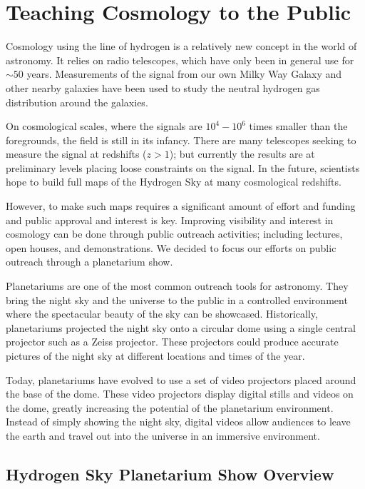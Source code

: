 \chapter{Teaching \cm Cosmology to the Public}\label{Ch:Planet}

Cosmology using the \cm line of hydrogen is a relatively new concept in the world of astronomy. It relies on radio telescopes, which have only been in general use for $\sim 50$ years. Measurements of the \cm signal from our own Milky Way Galaxy and other nearby galaxies have been used to study the neutral hydrogen gas distribution around the galaxies. 

On cosmological scales, where the \cm signals are $10^4 - 10^6$ times smaller than the foregrounds, the field is still in its infancy. There are many telescopes seeking to measure the \cm signal at redshifts ($z>1$); but currently the results are at preliminary levels placing loose constraints on the signal. In the future, scientists hope to build full maps of the Hydrogen Sky at many cosmological redshifts.  

However, to make such maps requires a significant amount of effort and funding and public approval and interest is key. Improving visibility and interest in \cm cosmology can be done through public outreach activities; including lectures, open houses, and demonstrations. We decided to focus our efforts on public outreach through a planetarium show. 

Planetariums are one of the most common outreach tools for astronomy. They bring the night sky and the universe to the public in a controlled environment where the spectacular beauty of the sky can be showcased. Historically, planetariums projected the night sky onto a circular dome using a single central projector such as a Zeiss projector. These projectors could produce accurate pictures of the night sky at different locations and times of the year.

Today, planetariums have evolved to use a set of video projectors placed around the base of the dome. These video projectors display digital stills and videos on the dome, greatly increasing the potential of the planetarium environment. Instead of simply showing the night sky, digital videos allow audiences to leave the earth and travel out into the universe in an immersive environment. 



\section{Hydrogen Sky Planetarium Show Overview}

